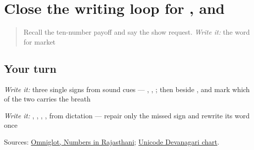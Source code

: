 \section[Practice]{Close the writing loop for ,  and }

\label{lesson:MW-R33-script-close}



\begin{quote}
Recall the ten-number payoff and say the show request. \emph{Write it:} the word for market
\end{quote}

\subsection*{Your turn}
\emph{Write it:} three single signs from sound cues — \textbf{}, \textbf{}, \textbf{}; then \textbf{} beside \textbf{}, and mark which of the two carries the breath

\emph{Write it:} \textbf{}, \textbf{}, \textbf{}, \textbf{}, \textbf{} from dictation — repair only the missed sign and rewrite its word once

\begin{tcolorbox}[breakable,colback=teal!4,colframe=teal!35!black,title={Before you move on}]
Sources: \href{https://www.omniglot.com/language/numbers/rajasthani.htm}{Omniglot, Numbers in Rajasthani}; \href{https://www.unicode.org/charts/PDF/U0900.pdf}{Unicode Devanagari chart}.
\end{tcolorbox}
